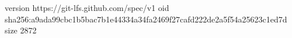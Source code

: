 version https://git-lfs.github.com/spec/v1
oid sha256:a9ada99cbc1b5bac7b1e44334a34fa2469f27cafd222de2a5f54a25623c1ed7d
size 2872
